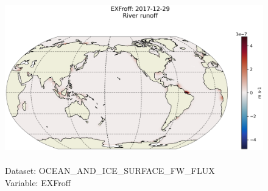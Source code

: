 \begin{figure}[H]
\centering
\includegraphics[scale=0.5]{../images/plots/latlon_plots/Ocean_and_Sea-Ice_Surface_Freshwater_Fluxes/EXFroff.png}
\caption{\\Dataset: OCEAN\_AND\_ICE\_SURFACE\_FW\_FLUX\\Variable: EXFroff}
\label{tab:table-OCEAN_AND_ICE_SURFACE_FW_FLUX_EXFroff-Plot}
\end{figure}
\pagebreak
